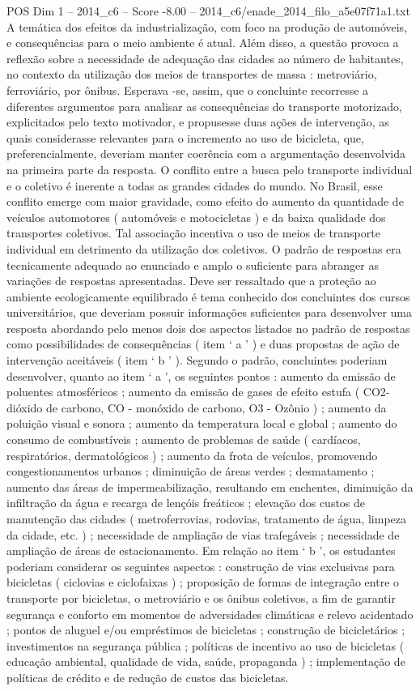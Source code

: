 \begin{textsample}{POS Dim 1 – 2014\_c6 – Score -8.00 – 2014\_c6/enade\_2014\_filo\_a5e07f71a1.txt}
A temática dos efeitos da industrialização, com foco na produção de automóveis, e consequências para o meio ambiente é atual.
Além disso, a questão provoca a reflexão sobre a necessidade de adequação das cidades ao número de habitantes, no contexto da utilização dos meios de transportes de massa : metroviário, ferroviário, por ônibus.
Esperava -se, assim, que o concluinte recorresse a diferentes argumentos para analisar as consequências do transporte motorizado, explicitados pelo texto motivador, e propusesse duas ações de intervenção, as quais considerasse relevantes para o incremento ao uso de bicicleta, que, preferencialmente, deveriam manter coerência com a argumentação desenvolvida na primeira parte da resposta.
O conflito entre a busca pelo transporte individual e o coletivo é inerente a todas as grandes cidades do mundo.
No Brasil, esse conflito emerge com maior gravidade, como efeito do aumento da quantidade de veículos automotores ( automóveis e motocicletas ) e da baixa qualidade dos transportes coletivos.
Tal associação incentiva o uso de meios de transporte individual em detrimento da utilização dos coletivos.
O padrão de respostas era tecnicamente adequado ao enunciado e amplo o suficiente para abranger as variações de respostas apresentadas.
Deve ser ressaltado que a proteção ao ambiente ecologicamente equilibrado é tema conhecido dos concluintes dos cursos universitários, que deveriam possuir informações suficientes para desenvolver uma resposta abordando pelo menos dois dos aspectos listados no padrão de respostas como possibilidades de consequências ( item ‘ a ’ ) e duas propostas de ação de intervenção aceitáveis ( item ‘ b ’ ).
Segundo o padrão, concluintes poderiam desenvolver, quanto ao item ‘ a ’, os seguintes pontos : aumento da emissão de poluentes atmosféricos ; aumento da emissão de gases de efeito estufa ( CO2- dióxido de carbono, CO - monóxido de carbono, O3 - Ozônio ) ; aumento da poluição visual e sonora ; aumento da temperatura local e global ; aumento do consumo de combustíveis ; aumento de problemas de saúde ( cardíacos, respiratórios, dermatológicos ) ; aumento da frota de veículos, promovendo congestionamentos urbanos ; diminuição de áreas verdes ; desmatamento ; aumento das áreas de impermeabilização, resultando em enchentes, diminuição da infiltração da água e recarga de lençóis freáticos ; elevação dos custos de manutenção das cidades ( metroferrovias, rodovias, tratamento de água, limpeza da cidade, etc. ) ; necessidade de ampliação de vias trafegáveis ; necessidade de ampliação de áreas de estacionamento.
Em relação ao item ‘ b ’, os estudantes poderiam considerar os seguintes aspectos : construção de vias exclusivas para bicicletas ( ciclovias e ciclofaixas ) ; proposição de formas de integração entre o transporte por bicicletas, o metroviário e os ônibus coletivos, a fim de garantir segurança e conforto em momentos de adversidades climáticas e relevo acidentado ; pontos de aluguel e/ou empréstimos de bicicletas ; construção de bicicletários ; investimentos na segurança pública ; políticas de incentivo ao uso de bicicletas ( educação ambiental, qualidade de vida, saúde, propaganda ) ; implementação de políticas de crédito e de redução de custos das bicicletas.

\end{textsample}
